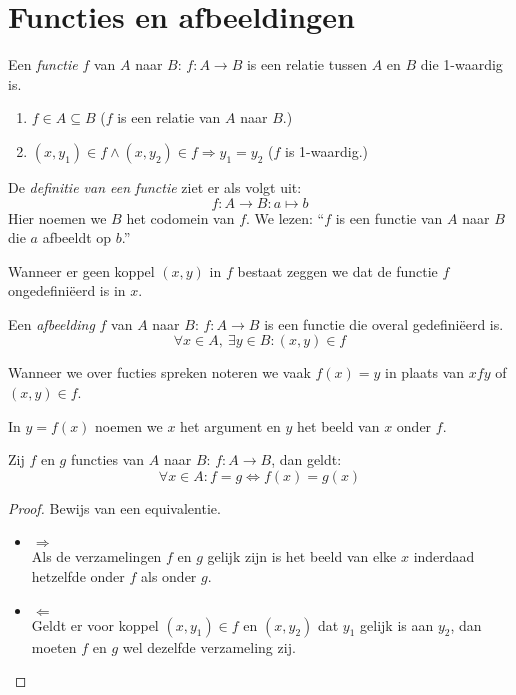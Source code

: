 \documentclass[main.tex]{subfiles}
\begin{document}
\chapter{Functies en afbeeldingen}
\label{cha:functies-en-afbeeldingen}

\begin{de}
  Een \emph{functie} $f$ van $A$ naar $B$: $f: A \rightarrow B$ is een relatie tussen $A$ en $B$ die 1-waardig is.
  \begin{enumerate}
  \item $f \in A \subseteq B$ ($f$ is een relatie van $A$ naar $B$.)
  \item $(x,y_{1}) \in f \wedge (x,y_{2}) \in f \Rightarrow y_{1} = y_{2}$ ($f$ is 1-waardig.)
  \end{enumerate}
\end{de}

\begin{de}
  De \emph{definitie van een functie} ziet er als volgt uit:
  \[ f: A \rightarrow B: a \mapsto b \]
  Hier noemen we $B$ het codomein van $f$.
  We lezen: ``$f$ is een functie van $A$ naar $B$ die $a$ afbeeldt op $b$.''
\end{de}

\begin{de}
  Wanneer er geen koppel $(x,y)$ in $f$ bestaat zeggen we dat de functie $f$ ongedefini\"eerd is in $x$.
\end{de}

\begin{de}
  Een \emph{afbeelding} $f$ van $A$ naar $B$: $f: A \rightarrow B$ is een functie die overal gedefini\"eerd is.
  \[ \forall x \in A,\ \exists y \in B: (x,y) \in f \]
\end{de}

\begin{de}
  Wanneer we over fucties spreken noteren we vaak $f(x) = y$ in plaats van $x f y$ of $(x,y) \in f$.
\end{de}

\begin{de}
  In $y = f(x)$ noemen we $x$ het argument en $y$ het beeld van $x$ onder $f$.
\end{de}

\begin{st}
  Zij $f$ en $g$ functies van $A$ naar $B$: $f: A \rightarrow B$, dan geldt:
  \[ \forall x \in A: f = g \Leftrightarrow f(x) = g(x) \]
  
  \begin{proof}
    Bewijs van een equivalentie.
    \begin{itemize}
    \item $\Rightarrow$\\
      Als de verzamelingen $f$ en $g$ gelijk zijn is het beeld van elke $x$ inderdaad hetzelfde onder $f$ als onder $g$.
    \item $\Leftarrow$\\
      Geldt er voor koppel $(x,y_{1}) \in f$ en $(x,y_{2})$ dat $y_{1}$ gelijk is aan $y_{2}$, dan moeten $f$ en $g$ wel dezelfde verzameling zij.
    \end{itemize}
  \end{proof}
\end{st}
\end{document}

